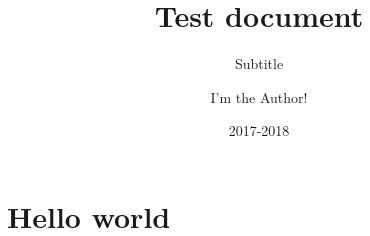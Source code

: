 \documentclass[]{article}
\title{Test document}
\subtitle{Subtitle}
\author{I'm the Author!}
\date{2017-2018}
\begin{document}
\maketitle
\section{Hello world}
\end{document}
